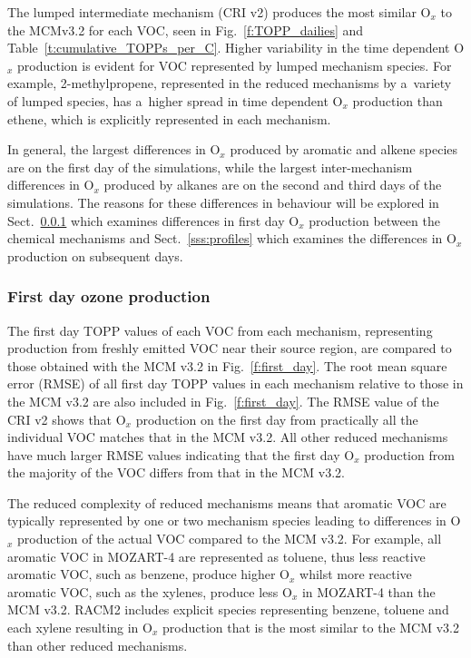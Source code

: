\documentclass[acpd, online, hvmath]{copernicus}
\providecommand{\DIFadd}[1]{{\protect\color{blue}\uwave{#1}}} %
\providecommand{\DIFaddbegin}{} %
\providecommand{\DIFaddend}{} %
\begin{document}
The lumped intermediate mechanism (CRI v2) produces the most similar
O$_{x}$ to the MCM\DIFaddbegin \DIFadd{~}\DIFaddend v3.2 for each VOC, seen in
Fig.~\ref{f:TOPP_dailies} and Table~\ref{t:cumulative_TOPPs_per_C}.
Higher variability in the time dependent O$_{x}$ production is
evident for VOC represented by lumped mechanism species.  For example,
2-methylpropene, represented in the reduced mechanisms by a~variety of
lumped species, has a~higher spread in time dependent O$_{x}$
production than ethene, which is explicitly represented in each
mechanism.

In general, the largest differences in O$_{x}$ produced by aromatic
and alkene species are on the first day of the simulations, while the
largest inter-mechanism differences in O$_{x}$ produced by alkanes
are on the second and third days of the simulations.  The reasons for
these differences in behaviour will be explored in
Sect.~\ref{sss:day1} which examines differences in first day
O$_{x}$ production between the chemical mechanisms and
Sect.~\ref{sss:profiles} which examines the differences in O$_{x}$
production on subsequent days.

\subsubsection{First day ozone production}
\label{sss:day1}

The first day TOPP values of each VOC from each mechanism,
representing  production from freshly emitted VOC near their
source region, are compared to those obtained with the MCM v3.{2} in
Fig.~\ref{f:first_day}.  The root mean square error (RMSE) of all
first day TOPP values in each mechanism relative to those in the MCM
v3.2 are also included in Fig.~\ref{f:first_day}.  The RMSE value of
the CRI v2 shows that O$_{x}$ production on the first day from
practically all the individual VOC matches that in the MCM v3.2.  All
other reduced mechanisms have much larger RMSE values indicating that
the first day O$_{x}$ production from the majority of the VOC
differs from that in the MCM v3.2.

The reduced complexity of reduced mechanisms means that aromatic VOC
are typically represented by one or two mechanism species leading to
differences in O$_{x}$ production of the actual VOC compared to the
MCM v3.2.  For example, all aromatic VOC in MOZART-4 are represented
as toluene, thus less reactive aromatic VOC, such as benzene, produce
higher O$_{x}$ whilst more reactive aromatic VOC, such as the
xylenes, produce less O$_{x}$ in MOZART-4 than the MCM v3.2.  RACM2
includes explicit species representing benzene, toluene and each
xylene resulting in O$_{x}$ production that is the most similar to
the MCM v3.2 than other reduced mechanisms.
\end{document}
